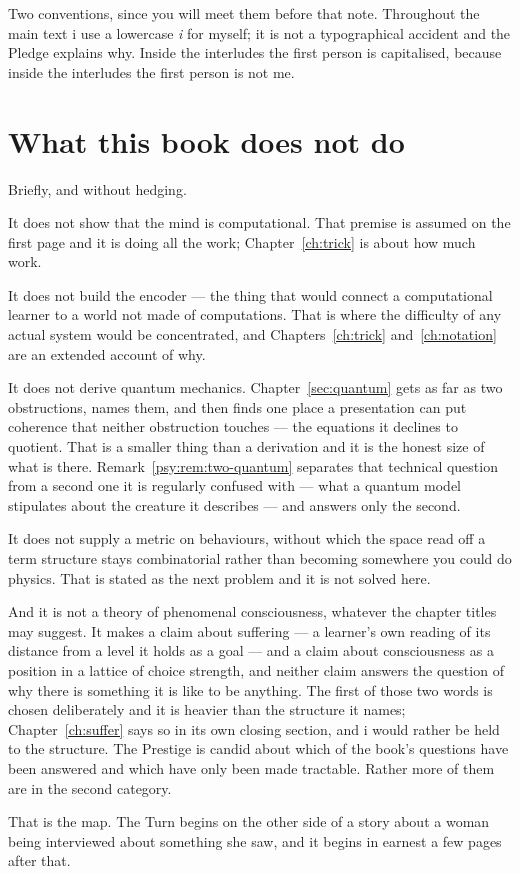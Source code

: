 Two conventions, since you will meet them before that note.
Throughout the main text i use a lowercase \emph{i} for myself; it
is not a typographical accident and the Pledge explains why.
Inside the interludes the first person is capitalised, because
inside the interludes the first person is not me.

\section*{What this book does not do}

Briefly, and without hedging.

It does not show that the mind is computational.
That premise is assumed on the first page and it is doing all the
work; Chapter~\ref{ch:trick} is about how much work.

It does not build the encoder --- the thing that would connect a
computational learner to a world not made of computations.
That is where the difficulty of any actual system would be
concentrated, and Chapters~\ref{ch:trick}
and~\ref{ch:notation} are an extended account of why.

It does not derive quantum mechanics.
Chapter~\ref{sec:quantum} gets as far as two obstructions, names
them, and then finds one place a presentation can put coherence
that neither obstruction touches --- the equations it declines to
quotient.
That is a smaller thing than a derivation and it is the honest size
of what is there.
Remark~\ref{psy:rem:two-quantum} separates that technical question
from a second one it is regularly confused with --- what a quantum
model stipulates about the creature it describes --- and answers only
the second.

It does not supply a metric on behaviours, without which the space
read off a term structure stays combinatorial rather than
becoming somewhere you could do physics.
That is stated as the next problem and it is not solved here.

And it is not a theory of phenomenal consciousness, whatever the
chapter titles may suggest.
It makes a claim about suffering --- a learner's own reading of its
distance from a level it holds as a goal --- and a claim about
consciousness as a position in a lattice of choice strength, and
neither claim answers the question of why there is something it is like
to be anything.
The first of those two words is chosen deliberately and it is heavier
than the structure it names; Chapter~\ref{ch:suffer} says so in its own
closing section, and i would rather be held to the structure.
The Prestige is candid about which of the book's questions have
been answered and which have only been made tractable.
Rather more of them are in the second category.

\bigskip
\noindent
That is the map.
The Turn begins on the other side of a story about a woman being
interviewed about something she saw, and it begins in earnest a few
pages after that.

\renewcommand{\thefigure}{\thechapter.\arabic{figure}}\setcounter{figure}{0}
